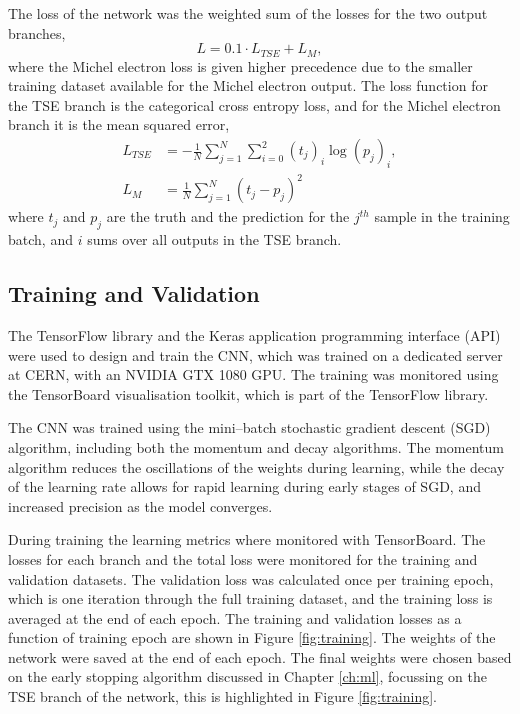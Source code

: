 The loss of the network was the weighted sum of the losses for the two output
branches,
\begin{equation*}
	L = 0.1 \cdot L_{TSE} + L_M,
\end{equation*}
where the Michel electron loss is given higher precedence due to the smaller
training dataset available for the Michel electron output. The loss function for
the TSE branch is the categorical cross entropy 
loss\cite{750fabedbacb467c8fafd98b87f77436}, and for the Michel electron branch
it is the mean squared error\cite{mse_springer},
\begin{align*}
	L_{TSE} &= - \frac{1}{N} \sum_{j=1}^N \sum_{i=0}^2 (t_j)_i \log (p_j)_i, \\
	L_M &= \frac{1}{N} \sum_{j=1}^N (t_j - p_j)^2
\end{align*}
where $t_j$ and $p_j$ are the truth and the prediction for the $j^{th}$ sample 
in the training batch, and $i$ sums over all outputs in the TSE branch. 

\subsection{Training and Validation}
The TensorFlow\cite{45381} library and the Keras\cite{chollet2015keras} 
application programming interface (API) were used to design and train the CNN, 
which was trained on a dedicated \protodune{} server at CERN, with an NVIDIA 
GTX 1080 GPU. The training was monitored using the TensorBoard visualisation 
toolkit, which is part of the TensorFlow library. 

The CNN was trained using the mini--batch stochastic gradient descent (SGD)
algorithm, including both the momentum and decay algorithms\cite{Reed1999}. 
The momentum algorithm reduces the oscillations of the weights during 
learning, while the decay of the learning rate allows for rapid learning 
during early stages of SGD, and increased precision as the model converges. 

During training the learning metrics where monitored with TensorBoard. The
losses for each branch and the total loss were monitored for the training
and validation datasets. The validation loss was calculated once per training
epoch, which is one iteration through the full training dataset, and the
training loss is averaged at the end of each epoch. The training and validation
losses as a function of training epoch are shown in Figure \ref{fig:training}.
The weights of the network were saved at the end of each epoch. The final
weights were chosen based on the early stopping algorithm discussed in Chapter
\ref{ch:ml}, focussing on the TSE branch of the network, this is highlighted 
in Figure \ref{fig:training}.

